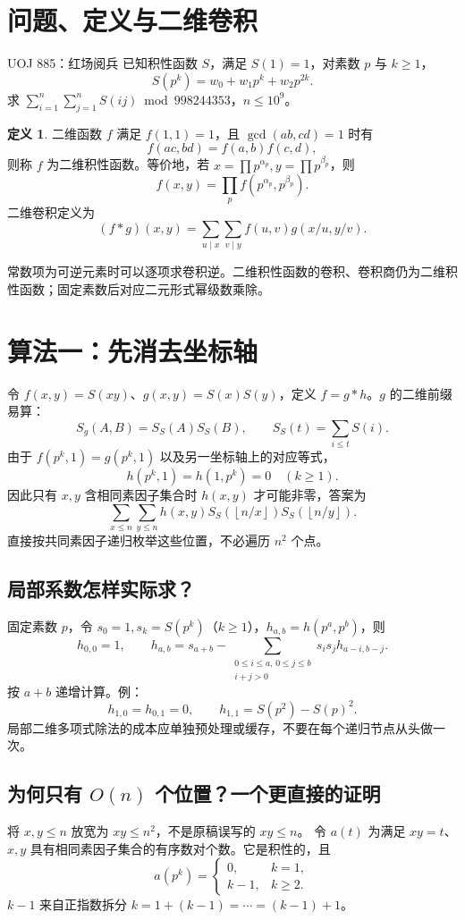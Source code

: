 \documentclass[UTF8,a4paper,11pt,oneside,openany,fontset=fandol]{ctexbook}
\theoremstyle{definition}
\newtheorem{definition}{定义}[chapter]
\newcommand{\floor}[1]{\left\lfloor #1\right\rfloor}
\begin{document}
\section{问题、定义与二维卷积}
\begin{problem}{UOJ 885：红场阅兵}
已知积性函数 $S$，满足 $S(1)=1$，对素数 $p$ 与 $k\ge1$，
\[
 S(p^k)=w_0+w_1p^k+w_2p^{2k}.
\]
求 $\sum_{i=1}^n\sum_{j=1}^nS(ij)\bmod998244353$，$n\le10^9$。
\end{problem}
\begin{definition}
二维函数 $f$ 满足 $f(1,1)=1$，且 $\gcd(ab,cd)=1$ 时有
\[
 f(ac,bd)=f(a,b)f(c,d),
\]
则称 $f$ 为二维积性函数。等价地，若 $x=\prod p^{\alpha_p},y=\prod p^{\beta_p}$，则
\[
 f(x,y)=\prod_p f(p^{\alpha_p},p^{\beta_p}).
\]
二维卷积定义为
\[
 (f*g)(x,y)=\sum_{u\mid x}\sum_{v\mid y}f(u,v)g(x/u,y/v).
\]
\end{definition}
常数项为可逆元素时可以逐项求卷积逆。二维积性函数的卷积、卷积商仍为二维积性函数；固定素数后对应二元形式幂级数乘除。



\section{算法一：先消去坐标轴}
令 $f(x,y)=S(xy)$、$g(x,y)=S(x)S(y)$，定义 $f=g*h$。$g$ 的二维前缀易算：
\[
 S_g(A,B)=S_S(A)S_S(B),\qquad S_S(t)=\sum_{i\le t}S(i).
\]
由于 $f(p^k,1)=g(p^k,1)$ 以及另一坐标轴上的对应等式，
\[
 h(p^k,1)=h(1,p^k)=0\quad(k\ge1).
\]
因此只有 $x,y$ 含相同素因子集合时 $h(x,y)$ 才可能非零，答案为
\[
 \sum_{x\le n}\sum_{y\le n}h(x,y)
 S_S(\floor{n/x})S_S(\floor{n/y}).
\]
直接按共同素因子递归枚举这些位置，不必遍历 $n^2$ 个点。


\subsection{局部系数怎样实际求？}
固定素数 $p$，令 $s_0=1,s_k=S(p^k)$（$k\ge1$），$h_{a,b}=h(p^a,p^b)$，则
\[
 h_{0,0}=1,\qquad
 h_{a,b}=s_{a+b}-\sum_{\substack{0\le i\le a,\,0\le j\le b\\i+j>0}}
 s_i s_j h_{a-i,b-j}.
\]
按 $a+b$ 递增计算。例：
\[
 h_{1,0}=h_{0,1}=0,\qquad h_{1,1}=S(p^2)-S(p)^2.
\]
局部二维多项式除法的成本应单独预处理或缓存，不要在每个递归节点从头做一次。

\subsection{为何只有 \texorpdfstring{$O(n)$}{O(n)} 个位置？一个更直接的证明}
将 $x,y\le n$ 放宽为 $xy\le n^2$，不是原稿误写的 $xy\le n$。
令 $a(t)$ 为满足 $xy=t$、$x,y$ 具有相同素因子集合的有序数对个数。它是积性的，且
\[
 a(p^k)=\begin{cases}0,&k=1,\\k-1,&k\ge2.\end{cases}
\]
$k-1$ 来自正指数拆分 $k=1+(k-1)=\cdots=(k-1)+1$。
\end{document}
